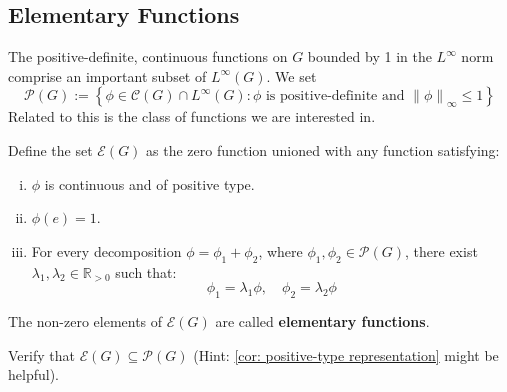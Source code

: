 \documentclass[11pt, x11names]{book}
\newcommand{\rr}{\mathbb{R}}
\newcommand{\fanc}{\mathscr{C}}
\newcommand{\fane}{\mathscr{E}}
\newcommand{\fanp}{\mathscr{P}}
\newcommand{\set}[1]{\left\{ #1 \right\}}
\newcommand{\norm}[1]{\left\lVert #1 \right \rVert}
\begin{document}
\subsection{Elementary Functions}
\label{subsection: Elementary Functions}
The positive-definite, continuous functions on $G$ bounded by 1 in the $L^\infty$ norm comprise an important subset of $L^\infty(G)$. We set 
\begin{equation*}
    \fanp(G) := \set{\phi \in \fanc(G) \cap L^\infty(G) : \phi \text{ is positive-definite and } \norm{\phi}_\infty \leq 1}
\end{equation*}
Related to this is the class of functions we are interested in.
\begin{defn}
    Define the set $\fane(G)$ as the zero function unioned with any function satisfying:
    \begin{enumerate}[(i)]
        \item $\phi$ is continuous and of positive type.
        \item $\phi(e) = 1$.
        \item For every decomposition $\phi = \phi_1 + \phi_2$, where $\phi_1,\phi_2 \in \fanp(G)$, there exist $\lambda_1, \lambda_2 \in \rr_{> 0}$ such that:
        \begin{equation*}
            \phi_1 = \lambda_1 \phi, \quad \phi_2 = \lambda_2 \phi
        \end{equation*}
    \end{enumerate}
    The non-zero elements of $\fane(G)$ are called \textbf{elementary functions}.
\end{defn}

\begin{sanitycheck}
    Verify that $\fane(G) \subseteq \fanp(G)$ (Hint: \ref{cor: positive-type representation} might be helpful).
\end{sanitycheck}
\end{document}
